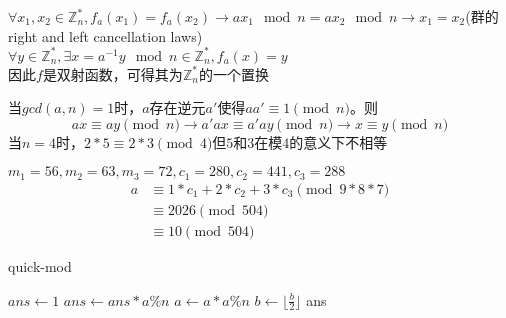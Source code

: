 \documentclass[a4paper, justified]{tufte-handout}
\begin{document}
\begin{problem}[TC 31.3-5]
\end{problem}

\begin{solution}
$\forall x_1,x_2\in \mathbb{Z}_n^{*}, f_a(x_1)=f_a(x_2)\to ax_1\mod n= ax_2\mod n \to x_1=x_2$(群的right and left cancellation laws)\\
$\forall y\in \mathbb{Z}_n^{*}, \exists x  = a^{-1}y \mod n \in \mathbb{Z}_n^{*}, f_a(x)=y$\\
因此$f$是双射函数，可得其为$\mathbb{Z}_n^{*}$的一个置换
\end{solution}

\begin{problem}[TC 31.4-2]
\end{problem}

\begin{solution}
当$gcd(a,n)=1$时，$a$存在逆元$a'$使得$aa'\equiv 1 \pmod n$。则
\[
ax\equiv ay \pmod n \to a'ax\equiv a'ay\pmod n\to x\equiv y\pmod n
\]
当$n=4$时，$2*5\equiv 2 *3 \pmod 4$但$5$和$3$在模$4$的意义下不相等
\end{solution}

\begin{problem}[TC 31.5-2]
\end{problem}

\begin{solution}
$m_1=56,m_2=63,m_3=72,c_1=280, c_2=441, c_3=288$\\
\[
\begin{aligned}
a&\equiv 1*c_1+2*c_2+3*c_3\pmod{9*8*7}\\
&\equiv 2026\pmod {504}\\
&\equiv 10 \pmod {504}
\end{aligned}
\]
\end{solution}
\newpage
\begin{problem}[TC 31.6-2]
\end{problem}

\begin{solution}
\begin{algorithm}
\caption{quick-mod}\label{euclid}
\begin{algorithmic}[1]
	\State $ans \gets 1$
			\State $ans \gets ans *a \%n$
		\EndIf
		\State $a\gets a*a\%n$
		\State $b\gets \lfloor \frac{b}{2}\rfloor$
	\EndWhile
	\State \Return ans 
	\EndProcedure
\end{algorithmic}
\end{algorithm}
\end{solution}
\end{document}
